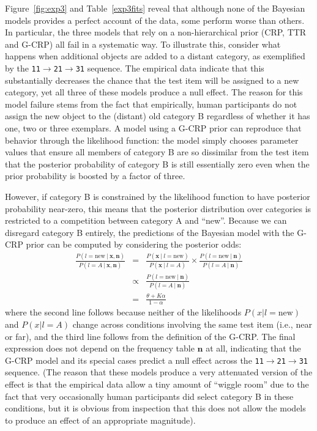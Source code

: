 \documentclass[doc]{apa6}
\newcommand{\given}{\ | \ }
\newcommand{\dist}[1]{\texttt{#1}}
\newcommand{\goesto}{$\rightarrow$}
\begin{document}
Figure~\ref{fig:exp3} and Table~\ref{exp3fits} reveal that although none of the Bayesian models provides a perfect account of the data, some perform worse than others. In particular, the three models that rely on a non-hierarchical prior (CRP, TTR and G-CRP) all fail in a systematic way. To illustrate this, consider what happens when additional objects are added to a distant category, as exemplified by the \dist{11}\goesto\dist{21}\goesto\dist{31} sequence. The empirical data indicate that this substantially decreases the chance that the test item will be assigned to a new category, yet all three of these models produce a null effect. The reason for this model failure stems from the fact that empirically, human participants do not assign the new object to the (distant) old category B regardless of whether it has one, two or three exemplars. A model using a G-CRP prior can reproduce that behavior through the likelihood function: the model simply chooses parameter values that ensure all members of category B are so dissimilar from the test item that the posterior probability of category B is still essentially zero even when the prior probability is boosted by a factor of three.

However, if category B is constrained by the likelihood function to have posterior probability near-zero, this means that the posterior distribution over categories is restricted to a competition between category A and ``new''. Because we can disregard category B entirely, the predictions of the Bayesian model with the G-CRP prior can be computed by considering the posterior odds:
\begin{eqnarray*}
\frac{P(l=\mbox{new} \given \bm{x},\bm{n})}{P(l=A \given \bm{x},\bm{n})}
&=& \frac{P(\bm{x} \given l=\mbox{new})}{P(\bm{x} \given l=A)}\times \frac{P(l=\mbox{new}\given \bm{n})}{P(l=A \given \bm{n})} \\
&\propto&\frac{P(l=\mbox{new}\given \bm{n})}{P(l=A \given \bm{n})} \\
&=& \frac{\theta + K\alpha}{1-\alpha}
\end{eqnarray*}
where the second line follows because neither of the likelihoods $P(x | l=\mbox{new})$ and $P(x | l=A)$ change across conditions involving the same test item (i.e., near or far), and the third line follows from the definition of the G-CRP. The final expression does not depend on the frequency table $\bm{n}$ at all, indicating that the G-CRP model and its special cases predict a null effect across the \dist{11}\goesto\dist{21}\goesto\dist{31} sequence. (The reason that these models produce a very attenuated version of the effect is that the empirical data allow a tiny amount of ``wiggle room'' due to the fact that very occasionally human participants did select category B in these conditions, but it is obvious from inspection that this does not allow the models to produce an effect of an appropriate magnitude).
\end{document}
